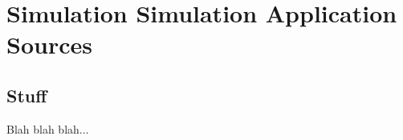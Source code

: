 \chapter{Simulation Simulation Application Sources}\label{applicationsources}

\section{Stuff}

Blah blah blah...

